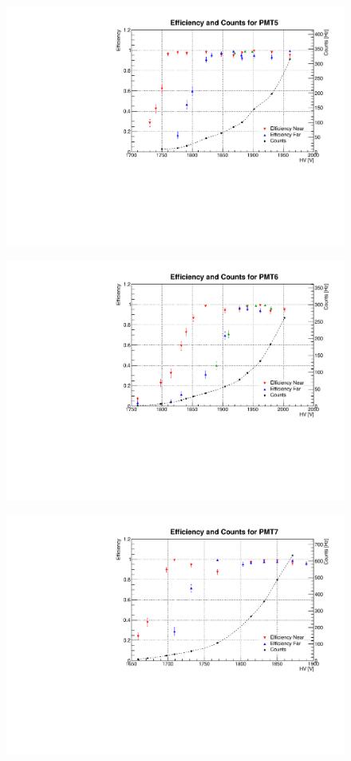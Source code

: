 \begin{figure}[h]
	\centerline{\includegraphics[scale=0.8]{img/eff5.pdf}}
\end{figure}
\begin{figure}[h]
	\centerline{\includegraphics[scale=0.8]{img/eff6.pdf}}
\end{figure}
\begin{figure}[h]
	\centerline{\includegraphics[scale=0.8]{img/eff7.pdf}}
\end{figure}
